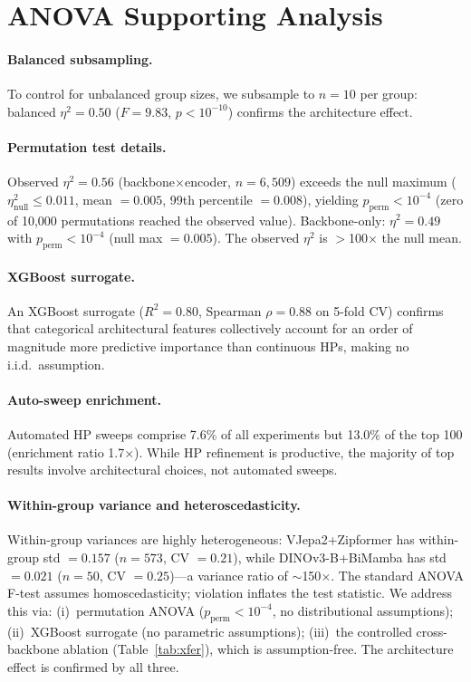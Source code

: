 \documentclass{article}
\begin{document}
\section{ANOVA Supporting Analysis}
\label{app:anova_support}

\paragraph{Balanced subsampling.}
To control for unbalanced group sizes, we subsample to $n = 10$ per group: balanced $\eta^2 = 0.50$ ($F = 9.83$, $p < 10^{-10}$) confirms the architecture effect.

\paragraph{Permutation test details.}
Observed $\eta^2 = 0.56$ (backbone$\times$encoder, $n = 6{,}509$) exceeds the null maximum ($\eta^2_{\mathrm{null}} \leq 0.011$, mean $= 0.005$, 99th percentile $= 0.008$), yielding $p_{\mathrm{perm}} < 10^{-4}$ (zero of 10{,}000 permutations reached the observed value). Backbone-only: $\eta^2 = 0.49$ with $p_{\mathrm{perm}} < 10^{-4}$ (null max $= 0.005$). The observed $\eta^2$ is $>$100$\times$ the null mean.

\paragraph{XGBoost surrogate.}
An XGBoost surrogate ($R^2 = 0.80$, Spearman $\rho = 0.88$ on 5-fold CV) confirms that categorical architectural features collectively account for an order of magnitude more predictive importance than continuous HPs, making no i.i.d.\ assumption.

\paragraph{Auto-sweep enrichment.}
Automated HP sweeps comprise 7.6\% of all experiments but 13.0\% of the top 100 (enrichment ratio 1.7$\times$). While HP refinement is productive, the majority of top results involve architectural choices, not automated sweeps.

\paragraph{Within-group variance and heteroscedasticity.}
Within-group variances are highly heterogeneous: VJepa2+Zipformer has within-group std $= 0.157$ ($n = 573$, CV $= 0.21$), while DINOv3-B+BiMamba has std $= 0.021$ ($n = 50$, CV $= 0.25$)---a variance ratio of $\sim$150$\times$. The standard ANOVA F-test assumes homoscedasticity; violation inflates the test statistic. We address this via: (i)~permutation ANOVA ($p_{\mathrm{perm}} < 10^{-4}$, no distributional assumptions); (ii)~XGBoost surrogate (no parametric assumptions); (iii)~the controlled cross-backbone ablation (Table~\ref{tab:xfer}), which is assumption-free. The architecture effect is confirmed by all three.
\end{document}
